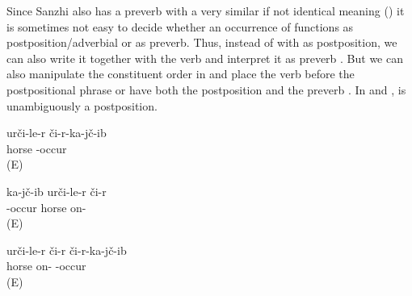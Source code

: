 Since Sanzhi also has a preverb  with a very similar if not identical meaning () it is sometimes not easy to decide whether an occurrence of  functions as postposition\slash adverbial or as preverb. Thus, instead of  with  as postposition, we can also write it together with the verb and interpret it as preverb .  But we can also manipulate the constituent order in  and place the verb before the postpositional phrase  or have both the postposition and the preverb . In  and ,  is unambiguously a postposition.

\begin{exe}
		\ex	\label{ex:He fell from the horse verbs_4}
	\gll	urči-le-r či-r-ka-jč-ib\\
		horse -occur\\
	\glt	{} (E)
	
	\ex	\label{ex:He fell from the horse verbs_2}
	\gll	ka-jč-ib urči-le-r	či-r \\
		-occur horse on-	\\
	\glt	{} (E)
	
		\ex	\label{ex:He fell from the horse verbs_3}
	\gll	urči-le-r či-r	či-r-ka-jč-ib\\
		horse on- -occur\\
	\glt	{} (E)
	
\end{exe}


\subsection{ }
\label{ssec:postposition urka}

